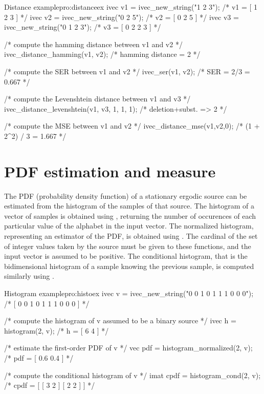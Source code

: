 \begin{program}{Distance example}{pro:distanceex}
ivec v1 = ivec_new_string("1 2 3");            /* v1 = [ 1 2 3 ]        */
ivec v2 = ivec_new_string("0 2 5");            /* v2 = [ 0 2 5 ]        */
ivec v3 = ivec_new_string("0 1 2 3");          /* v3 = [ 0 2 2 3 ]      */

/* compute the hamming distance between v1 and v2 */
ivec_distance_hamming(v1, v2);                 /* hamming distance = 2  */ 

/* compute the SER between v1 and v2 */
ivec_ser(v1, v2);                              /* SER = 2/3 = 0.667     */ 

/* compute the Levenshtein distance between v1 and v3 */
ivec_distance_levenshtein(v1, v3, 1, 1, 1);    /* deletion+subst. => 2  */

/* compute the MSE between v1 and v2 */
ivec_distance_mse(v1,v2,0);                    /* (1 + 2^2) / 3 = 1.667 */
\end{program}


\section{PDF estimation and measure}

    The PDF (probability density function) of a stationary ergodic
    source can be estimated from the histogram of the samples of that
    source. The histogram of a vector of samples is obtained using
    , returning the
    number of occurences of each particular value of the alphabet in
    the input vector. The normalized histogram, representing an
    estimator of the PDF, is obtained using 
    . The
    cardinal of the set of integer values taken by the source must be
    given to these functions, and the input vector is assumed to be
    positive. The conditional histogram, that is the bidimensional
    histogram of a sample knowing the previous sample, is computed
    similarly using .

\begin{program}{Histogram example}{pro:histoex}
ivec v = ivec_new_string("0 0 1 0 1 1 1 0 0 0"); /* [ 0 0 1 0 1 1 1 0 0 0 ] */

/* compute the histogram of v assumed to be a binary source */
ivec h = histogram(2, v);                        /* h = [ 6 4 ]             */

/* estimate the first-order PDF of v */       
vec pdf = histogram_normalized(2, v);            /* pdf = [ 0.6 0.4 ]       */

/* compute the conditional histogram of v */       
imat cpdf = histogram_cond(2, v);                 /* cpdf = [ [ 3 2 ]
                                                             [ 2 2 ] ]      */
\end{program}

